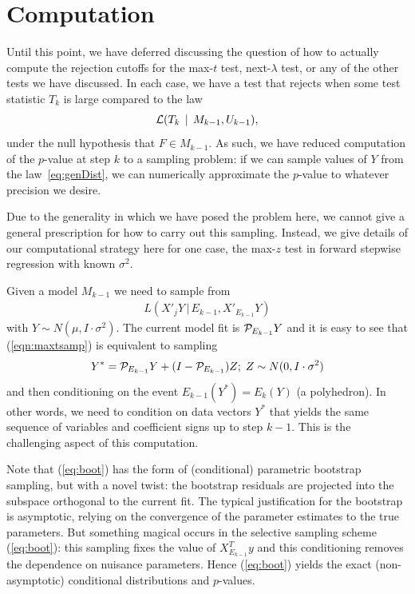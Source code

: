 \documentclass{article}
\begin{document}
\section{Computation}
\label{sec:computation}

Until this point, we have deferred discussing the question of how to actually compute the rejection cutoffs for the max-$t$ test, next-$\lambda$ test, or any of the other tests we have discussed. In each case, we have a test that rejects when some test statistic $T_k$ is large compared to the law
\begin{equation}\label{eq:genDist}
\mathcal{L}(T_k \,\mid\, M_{k-1}, U_{k-1}),
\end{equation}
under the null hypothesis that $F\in M_{k-1}$. As such, we have reduced computation of the $p$-value at step $k$ to a sampling problem: if we can sample values of $Y$ from the law~\eqref{eq:genDist}, we can numerically approximate the $p$-value to whatever precision we desire.

Due to the generality in which we have posed the problem here, we cannot give a general prescription for how to carry out this sampling. Instead, we give details of our computational strategy here for one case, the max-$z$ test in forward stepwise regression with known $\sigma^2$.

Given a model $M_{k-1}$   we need to sample from 
\begin{eqnarray}
L(X'_jY \,|\, E_{k-1},X'_{E_{k-1}}Y)
\label{eqn:maxtsamp}
\end{eqnarray}
with $Y\sim N(\mu, I \cdot \sigma^2)$.
The current model fit is $\mathcal{P}_{E_{k-1}} Y$ and it is easy to see that (\ref{eqn:maxtsamp})  is equivalent to sampling
\begin{eqnarray}
Y^*=\mathcal{P}_{E_{k-1}} Y + (I- \mathcal{P}_{E_{k-1}}) Z; \;Z\sim N(0,I\cdot\sigma^2)
\label{eq:boot}
\end{eqnarray}
and then conditioning on the event $E_{k-1}(Y^*)= E_k(Y)$ (a polyhedron).
In other words, we need to condition on data vectors  $Y^*$ that yields the same
sequence of variables and coefficient signs up to step $k-1$. This is the challenging aspect of this computation.

Note that  (\ref{eq:boot})  has the form of  (conditional) parametric bootstrap sampling, but  with  a novel twist:  the bootstrap residuals are projected into the subspace
orthogonal to the current fit.  The typical justification for the bootstrap is asymptotic, relying on the convergence of the parameter estimates to the true parameters.
But something magical  occurs in the selective sampling scheme (\ref{eq:boot}): this  sampling fixes the value of $ X_{E_{k-1}}^Ty$ and this conditioning
removes the dependence on nuisance parameters.
Hence  (\ref{eq:boot}) yields the exact (non-asymptotic) conditional distributions and $p$-values.
\end{document}

